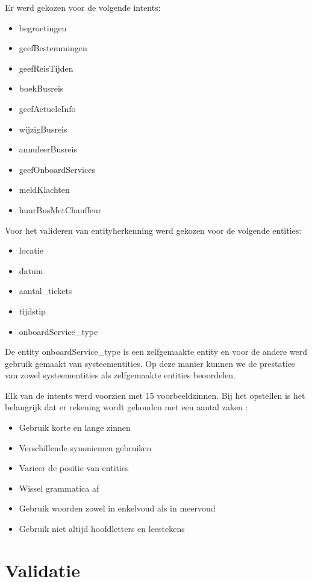 Er werd gekozen voor de volgende intents:
\begin{itemize}
    \item begroetingen
    \item geefBestemmingen
    \item geefReisTijden
    \item boekBusreis
    \item geefActueleInfo
    \item wijzigBusreis
    \item annuleerBusreis
    \item geefOnboardServices
    \item meldKlachten
    \item huurBusMetChauffeur
\end{itemize}

Voor het valideren van entityherkenning werd gekozen voor de volgende entities:
\begin{itemize}
    \item locatie
    \item datum
    \item aantal\_tickets
    \item tijdstip
    \item onboardService\_type
\end{itemize}

De entity onboardService\_type is een zelfgemaakte entity en voor de andere werd gebruik gemaakt van systeementities. Op deze manier kunnen we de prestaties van zowel systeementities als zelfgemaakte entities beoordelen.


Elk van de intents werd voorzien met 15 voorbeeldzinnen. Bij het opstellen is het belangrijk dat er rekening wordt gehouden met een aantal zaken \autocite{Greyling2019}:
\begin{itemize}
    \item Gebruik korte en lange zinnen
    \item Verschillende synoniemen gebruiken
    \item Varieer de positie van entities
    \item Wissel grammatica af
    \item Gebruik woorden zowel in enkelvoud als in meervoud
    \item Gebruik niet altijd hoofdletters en leestekens
\end{itemize}

\section{Validatie}
\label{sec:validatie}

